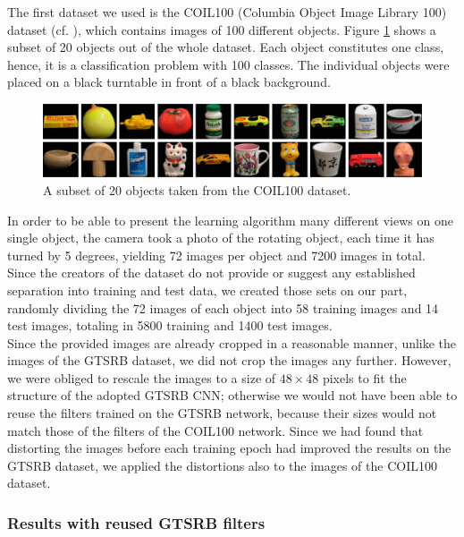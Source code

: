 \documentclass[11pt, a4paper]{article}
\begin{document}
The first dataset we used is the COIL100 (Columbia Object Image Library 100) dataset (cf. \cite{columbia_object_image_library}), which contains images of 100 different objects. Figure \ref{fig:coil100_objects} shows a subset of 20 objects out of the whole dataset. Each object constitutes one class, hence, it is a classification problem with 100 classes. The individual objects were placed on a black turntable in front of a black background. 
\begin{figure}[h!]
	\centering
	\includegraphics[width=1\textwidth]{coil100}
	\caption{A subset of 20 objects taken from the COIL100 dataset.}
	\label{fig:coil100_objects}
\end{figure}
In order to be able to present the learning algorithm many different views on one single object, the camera took a photo of the rotating object, each time it has turned by 5 degrees, yielding 72 images per object and 7200 images in total. Since the creators of the dataset do not provide or suggest any established separation into training and test data, we created those sets on our part, randomly dividing the 72 images of each object into 58 training images and 14 test images, totaling in 5800 training and 1400 test images.\\
Since the provided images are already cropped in a reasonable manner, unlike the images of the GTSRB dataset, we did not crop the images any further. However, we were obliged to rescale the images to a size of $48 \times 48$ pixels to fit the structure of the adopted GTSRB CNN; otherwise we would not have been able to reuse the filters trained on the GTSRB network, because their sizes would not match those of the filters of the COIL100 network. Since we had found that distorting the images before each training epoch had improved the results on the GTSRB dataset, we applied the distortions also to the images of the COIL100 dataset.

\subsubsection{Results with reused GTSRB filters}
\end{document}
